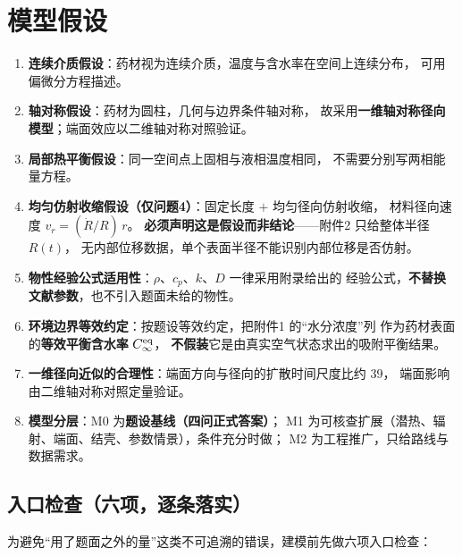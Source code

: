 \section{模型假设}

\begin{enumerate}[leftmargin=2.4em, itemsep=3pt]
  \item \textbf{连续介质假设}：药材视为连续介质，温度与含水率在空间上连续分布，
        可用偏微分方程描述。
  \item \textbf{轴对称假设}：药材为圆柱，几何与边界条件轴对称，
        故采用\textbf{一维轴对称径向模型}；端面效应以二维轴对称对照验证。
  \item \textbf{局部热平衡假设}：同一空间点上固相与液相温度相同，
        不需要分别写两相能量方程。
  \item \textbf{均匀仿射收缩假设（仅问题4）}：固定长度 $+$ 均匀径向仿射收缩，
        材料径向速度 $v_r=(\dot R/R)\,r$。
        \textbf{必须声明这是假设而非结论}——附件2 只给整体半径 $R(t)$，
        无内部位移数据，单个表面半径不能识别内部位移是否仿射。
  \item \textbf{物性经验公式适用性}：$\rho$、$c_p$、$k$、$D$ 一律采用附录给出的
        经验公式，\textbf{不替换文献参数}，也不引入题面未给的物性。
  \item \textbf{环境边界等效约定}：按题设等效约定，把附件1 的``水分浓度''列
        作为药材表面的\textbf{等效平衡含水率} $C_\infty^{\mathrm{eq}}$，
        \textbf{不假装}它是由真实空气状态求出的吸附平衡结果。
  \item \textbf{一维径向近似的合理性}：端面方向与径向的扩散时间尺度比约 $39$，
        端面影响由二维轴对称对照定量验证。
  \item \textbf{模型分层}：M0 为\textbf{题设基线（四问正式答案）}；
        M1 为可核查扩展（潜热、辐射、端面、结壳、参数情景），条件充分时做；
        M2 为工程推广，只给路线与数据需求。
\end{enumerate}

\subsection{入口检查（六项，逐条落实）}

为避免``用了题面之外的量''这类不可追溯的错误，建模前先做六项入口检查：

